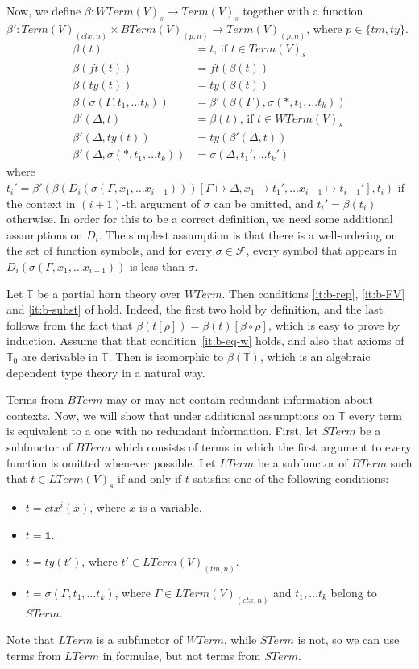\documentclass[reqno]{amsart}
\theoremstyle{definition}
\theoremstyle{remark}
\newcommand{\emptyCtx}{\mathbf{1}}
\numberwithin{figure}{section}
\begin{document}
Now, we define $\beta : WTerm(V)_s \to Term(V)_s$ together with a function $\beta' : Term(V)_{(ctx,n)} \times BTerm(V)_{(p,n)} \to Term(V)_{(p,n)}$, where $p \in \{ tm,ty \}$.
\begin{align*}
\beta(t) & = t \text{, if } t \in Term(V)_s \\
\beta(ft(t)) & = ft(\beta(t)) \\
\beta(ty(t)) & = ty(\beta(t)) \\
\beta(\sigma(\Gamma, t_1, \ldots t_k)) & = \beta'(\beta(\Gamma), \sigma(*, t_1, \ldots t_k)) \\
\beta'(\Delta, t) & = \beta(t) \text{, if } t \in WTerm(V)_s \\
\beta'(\Delta, ty(t)) & = ty(\beta'(\Delta, t)) \\
\beta'(\Delta, \sigma(*, t_1, \ldots t_k)) & = \sigma(\Delta, t_1', \ldots t_k')
\end{align*}
where $t_i' = \beta'(\beta(D_i(\sigma(\Gamma, x_1, \ldots x_{i-1})))[\Gamma \mapsto \Delta, x_1 \mapsto t_1', \ldots x_{i-1} \mapsto t_{i-1}'], t_i)$
    if the context in $(i+1)$-th argument of $\sigma$ can be omitted, and $t_i' = \beta(t_i)$ otherwise.
In order for this to be a correct definition, we need some additional assumptions on $D_i$.
The simplest assumption is that there is a well-ordering on the set of function symbols, and for every $\sigma \in \mathcal{F}$,
    every symbol that appears in $D_i(\sigma(\Gamma, x_1, \ldots x_{i-1}))$ is less than $\sigma$.

Let $\mathbb{T}$ be a partial horn theory over $WTerm$.
Then conditions \eqref{it:b-rep}, \eqref{it:b-FV} and \eqref{it:b-subst} of  hold.
Indeed, the first two hold by definition, and the last follows from the fact that $\beta(t[\rho]) = \beta(t)[\beta \circ \rho]$, which is easy to prove by induction.
Assume that that condition~\eqref{it:b-eq-w} holds, and also that axioms of $\mathbb{T}_0$ are derivable in $\mathbb{T}$.
Then is isomorphic to $\beta(\mathbb{T})$, which is an algebraic dependent type theory in a natural way.

Terms from $BTerm$ may or may not contain redundant information about contexts.
Now, we will show that under additional assumptions on $\mathbb{T}$ every term is equivalent to a one with no redundant information.
First, let $STerm$ be a subfunctor of $BTerm$ which consists of terms in which the first argument to every function is omitted whenever possible.
Let $LTerm$ be a subfunctor of $BTerm$ such that $t \in LTerm(V)_s$ if and only if $t$ satisfies one of the following conditions:
\begin{itemize}
\item $t = ctx^i(x)$, where $x$ is a variable.
\item $t = \emptyCtx$.
\item $t = ty(t')$, where $t' \in LTerm(V)_{(tm,n)}$.
\item $t = \sigma(\Gamma, t_1, \ldots t_k)$, where $\Gamma \in LTerm(V)_{(ctx,n)}$ and $t_1, \ldots t_k$ belong to $STerm$.
\end{itemize}
Note that $LTerm$ is a subfunctor of $WTerm$, while $STerm$ is not, so we can use terms from $LTerm$ in formulae, but not terms from $STerm$.
\end{document}
